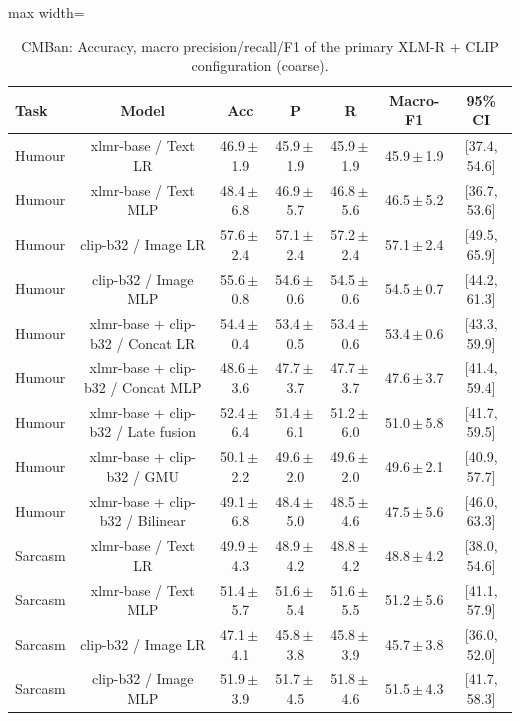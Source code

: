 \begin{table}[t]
\centering
\small
\caption{CMBan: Accuracy, macro precision/recall/F1 of the primary XLM-R + CLIP configuration (coarse).}
\label{tab:primary_coarse_cmban}
\begin{adjustbox}{max width=\textwidth}
\begin{tabular}{lcccccc}
\toprule
Task & Model & Acc & P & R & Macro-F1 & 95\% CI \\
\midrule
Humour & xlmr-base / Text LR & 46.9\,$\pm$\,1.9 & 45.9\,$\pm$\,1.9 & 45.9\,$\pm$\,1.9 & 45.9\,$\pm$\,1.9 & [37.4, 54.6] \\
Humour & xlmr-base / Text MLP & 48.4\,$\pm$\,6.8 & 46.9\,$\pm$\,5.7 & 46.8\,$\pm$\,5.6 & 46.5\,$\pm$\,5.2 & [36.7, 53.6] \\
Humour & clip-b32 / Image LR & 57.6\,$\pm$\,2.4 & 57.1\,$\pm$\,2.4 & 57.2\,$\pm$\,2.4 & 57.1\,$\pm$\,2.4 & [49.5, 65.9] \\
Humour & clip-b32 / Image MLP & 55.6\,$\pm$\,0.8 & 54.6\,$\pm$\,0.6 & 54.5\,$\pm$\,0.6 & 54.5\,$\pm$\,0.7 & [44.2, 61.3] \\
Humour & xlmr-base + clip-b32 / Concat LR & 54.4\,$\pm$\,0.4 & 53.4\,$\pm$\,0.5 & 53.4\,$\pm$\,0.6 & 53.4\,$\pm$\,0.6 & [43.3, 59.9] \\
Humour & xlmr-base + clip-b32 / Concat MLP & 48.6\,$\pm$\,3.6 & 47.7\,$\pm$\,3.7 & 47.7\,$\pm$\,3.7 & 47.6\,$\pm$\,3.7 & [41.4, 59.4] \\
Humour & xlmr-base + clip-b32 / Late fusion & 52.4\,$\pm$\,6.4 & 51.4\,$\pm$\,6.1 & 51.2\,$\pm$\,6.0 & 51.0\,$\pm$\,5.8 & [41.7, 59.5] \\
Humour & xlmr-base + clip-b32 / GMU & 50.1\,$\pm$\,2.2 & 49.6\,$\pm$\,2.0 & 49.6\,$\pm$\,2.0 & 49.6\,$\pm$\,2.1 & [40.9, 57.7] \\
Humour & xlmr-base + clip-b32 / Bilinear & 49.1\,$\pm$\,6.8 & 48.4\,$\pm$\,5.0 & 48.5\,$\pm$\,4.6 & 47.5\,$\pm$\,5.6 & [46.0, 63.3] \\
Sarcasm & xlmr-base / Text LR & 49.9\,$\pm$\,4.3 & 48.9\,$\pm$\,4.2 & 48.8\,$\pm$\,4.2 & 48.8\,$\pm$\,4.2 & [38.0, 54.6] \\
Sarcasm & xlmr-base / Text MLP & 51.4\,$\pm$\,5.7 & 51.6\,$\pm$\,5.4 & 51.6\,$\pm$\,5.5 & 51.2\,$\pm$\,5.6 & [41.1, 57.9] \\
Sarcasm & clip-b32 / Image LR & 47.1\,$\pm$\,4.1 & 45.8\,$\pm$\,3.8 & 45.8\,$\pm$\,3.9 & 45.7\,$\pm$\,3.8 & [36.0, 52.0] \\
Sarcasm & clip-b32 / Image MLP & 51.9\,$\pm$\,3.9 & 51.7\,$\pm$\,4.5 & 51.8\,$\pm$\,4.6 & 51.5\,$\pm$\,4.3 & [41.7, 58.3] \\

\end{tabular}
\end{adjustbox}
\end{table}
